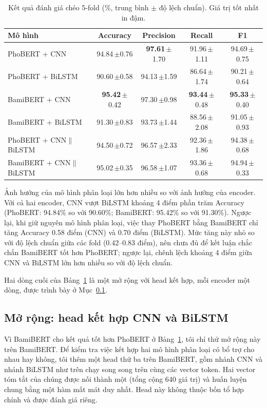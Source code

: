\documentclass[conference,a4paper]{IEEEtran}
\newcommand{\pmv}[2]{#1\,{\scriptsize$\pm$#2}}
\begin{document}
\begin{table}[t]
  \centering
  \caption{Kết quả đánh giá chéo 5-fold (\%, trung bình $\pm$ độ lệch chuẩn). Giá trị tốt nhất in đậm.}
  \label{tab:main}
  \setlength{\tabcolsep}{0.8pt}
  \begin{tabular}{lcccc}
    \toprule
    Mô hình & Accuracy & Precision & Recall & F1 \\
    \midrule
    PhoBERT + CNN     & \pmv{94.84}{0.76} & \pmv{\textbf{97.61}}{1.70} & \pmv{91.96}{1.11} & \pmv{94.69}{0.75} \\
    PhoBERT + BiLSTM  & \pmv{90.60}{0.58} & \pmv{94.13}{1.59} & \pmv{86.64}{1.74} & \pmv{90.21}{0.64} \\
    BamiBERT + CNN    & \pmv{\textbf{95.42}}{0.42} & \pmv{97.30}{0.98} & \pmv{\textbf{93.44}}{0.48} & \pmv{\textbf{95.33}}{0.40} \\
    BamiBERT + BiLSTM & \pmv{91.30}{0.83} & \pmv{93.73}{1.44} & \pmv{88.56}{2.08} & \pmv{91.05}{0.93} \\
    \midrule
    {\scriptsize PhoBERT + CNN$\|$BiLSTM} & \pmv{94.50}{0.72} & \pmv{96.57}{2.33} & \pmv{92.36}{1.86} & \pmv{94.38}{0.68} \\
    {\scriptsize BamiBERT + CNN$\|$BiLSTM} & \pmv{95.02}{0.35} & \pmv{96.58}{1.07} & \pmv{93.36}{0.68} & \pmv{94.94}{0.33} \\
    \bottomrule
  \end{tabular}
\end{table}

Ảnh hưởng của mô hình phân loại lớn hơn nhiều so với ảnh hưởng của encoder. Với cả hai encoder, CNN vượt BiLSTM khoảng 4 điểm phần trăm Accuracy (PhoBERT: 94.84\% so với 90.60\%; BamiBERT: 95.42\% so với 91.30\%). Ngược lại, khi giữ nguyên mô hình phân loại, việc thay PhoBERT bằng BamiBERT chỉ tăng Accuracy 0.58 điểm (CNN) và 0.70 điểm (BiLSTM). Mức tăng này nhỏ so với độ lệch chuẩn giữa các fold (0.42--0.83 điểm), nên chưa đủ để kết luận chắc chắn BamiBERT tốt hơn PhoBERT; ngược lại, chênh lệch khoảng 4 điểm giữa CNN và BiLSTM lớn hơn nhiều so với độ lệch chuẩn.

Hai dòng cuối của Bảng~\ref{tab:main} là một mở rộng với head kết hợp, mỗi encoder một dòng, được trình bày ở Mục~\ref{sec:ext}.




\subsection{Mở rộng: head kết hợp CNN và BiLSTM}
\label{sec:ext}
Vì BamiBERT cho kết quả tốt hơn PhoBERT ở Bảng~\ref{tab:main}, tôi chỉ thử mở rộng này trên BamiBERT. Để kiểm tra việc kết hợp hai mô hình phân loại có bổ trợ cho nhau hay không, tôi thêm một head thứ ba trên BamiBERT, gồm nhánh CNN và nhánh BiLSTM như trên chạy song song trên cùng các vector token. Hai vector tóm tắt của chúng được nối thành một (tổng cộng 640 giá trị) và huấn luyện chung bằng một hàm mất mát duy nhất. Head này không thuộc bốn tổ hợp chính và được đánh giá riêng.
\end{document}
